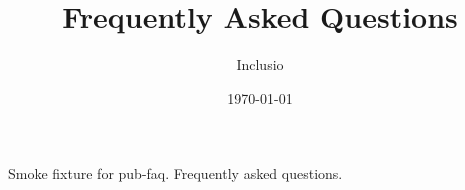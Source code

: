 \documentclass[final,tagged]{pub-faq}
\title{Frequently Asked Questions}
\author{Inclusio}
\date{\today}
\begin{document}
Smoke fixture for pub-faq. Frequently asked questions.
\end{document}
